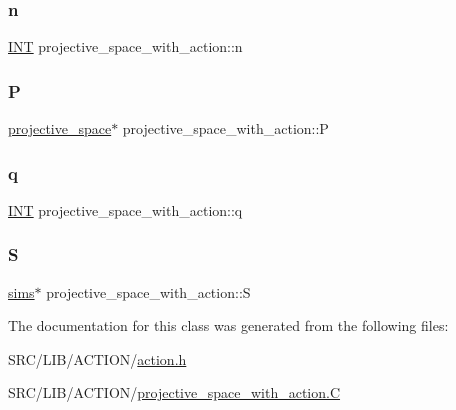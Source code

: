 \subsubsection{\texorpdfstring{n}{n}}
{\footnotesize\ttfamily \mbox{\hyperlink{galois_8h_a09fddde158a3a20bd2dcadb609de11dc}{I\+NT}} projective\+\_\+space\+\_\+with\+\_\+action\+::n}

\mbox{\label{classprojective__space__with__action_a3371a6d9c721634d8ee1361324b9a16e}} 
\subsubsection{\texorpdfstring{P}{P}}
{\footnotesize\ttfamily \mbox{\hyperlink{classprojective__space}{projective\+\_\+space}}$\ast$ projective\+\_\+space\+\_\+with\+\_\+action\+::P}

\mbox{\label{classprojective__space__with__action_abcc53716430d9ceb986f8385196d3d05}} 
\subsubsection{\texorpdfstring{q}{q}}
{\footnotesize\ttfamily \mbox{\hyperlink{galois_8h_a09fddde158a3a20bd2dcadb609de11dc}{I\+NT}} projective\+\_\+space\+\_\+with\+\_\+action\+::q}

\mbox{\label{classprojective__space__with__action_ac3254548af04948de40d67263edbc0dc}} 
\subsubsection{\texorpdfstring{S}{S}}
{\footnotesize\ttfamily \mbox{\hyperlink{classsims}{sims}}$\ast$ projective\+\_\+space\+\_\+with\+\_\+action\+::S}



The documentation for this class was generated from the following files\+:\begin{DoxyCompactItemize}
\item 
S\+R\+C/\+L\+I\+B/\+A\+C\+T\+I\+O\+N/\mbox{\hyperlink{action_8h}{action.\+h}}\item 
S\+R\+C/\+L\+I\+B/\+A\+C\+T\+I\+O\+N/\mbox{\hyperlink{projective__space__with__action_8_c}{projective\+\_\+space\+\_\+with\+\_\+action.\+C}}\end{DoxyCompactItemize}
